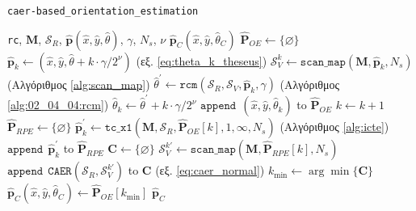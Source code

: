 \begin{algorithm}
  \caption{\texttt{caer-based\_orientation\_estimation}}
  \label{alg:02_04_04:rc}
  \begin{spacing}{1.5}
  \begin{algorithmic}[1]
    \REQUIRE \texttt{rc}, $\bm{M}$, $\mathcal{S}_R$, $\hat{\bm{p}}(\hat{x}, \hat{y}, \hat{\theta})$, $\gamma$, $N_s$, $\nu$
    \ENSURE $\hat{\bm{p}}_C(\hat{x}, \hat{y}, \hat{\theta}_C)$
    \STATE {}$\hat{\bm{P}}_{OE} \leftarrow \{\varnothing\}$
      \STATE $\hat{\bm{p}}_k \leftarrow (\hat{x}, \hat{y}, \hat{\theta} + k \cdot \gamma/2^\nu)$ \hfill (εξ. \ref{eq:theta_k_theseus})
      \STATE $\mathcal{S}_V^k \leftarrow \texttt{scan\_map}(\bm{M}, \hat{\bm{p}}_k, N_s)$ \hfill (Αλγόριθμος \ref{alg:scan_map})
      \STATE $\hat{\theta}^\prime \leftarrow \texttt{rcm}(\mathcal{S}_R, \mathcal{S}_V, \hat{\bm{p}}_k, \gamma)$ \hfill (Αλγόριθμος \ref{alg:02_04_04:rcm})
      \STATE $\hat{\theta}_k \leftarrow \hat{\theta}^\prime + k \cdot \gamma/2^\nu$
      \STATE $\texttt{append} \ \ (\hat{x}, \hat{y}, \hat{\theta}_k)$ to $\hat{\bm{P}}_{OE}$
      \STATE $k \leftarrow k + 1$
    \ENDFOR {}
    \STATE {}$\hat{\bm{P}}_{RPE} \leftarrow \{\varnothing\}$
      \STATE $\hat{\bm{p}}_k^\prime \leftarrow \texttt{tc\_x1}(\bm{M}, \mathcal{S}_R, \hat{\bm{P}}_{OE}[k], 1, \infty, N_s)$ \hfill (Αλγόριθμος \ref{alg:icte})
      \STATE $\texttt{append} \ \ \hat{\bm{p}}_k^\prime$ to $\hat{\bm{P}}_{RPE}$
    \ENDFOR{}
    \STATE {}$\bm{C} \leftarrow \{\varnothing\}$
      \STATE $\mathcal{S}_V^{k \prime} \leftarrow \texttt{scan\_map}(\bm{M}, \hat{\bm{P}}_{RPE}[k], N_s)$
      \STATE $\texttt{append} \ \ \texttt{CAER}(\mathcal{S}_R, \mathcal{S}_V^{k \prime})$ to $\bm{C}$ \hfill (εξ. \ref{eq:caer_normal})
    \ENDFOR{}
    \STATE $k_{\min} \leftarrow \arg\min \{\bm{C}\}$
    \STATE $\hat{\bm{p}}_C(\hat{x}, \hat{y}, \hat{\theta}_C) \leftarrow \hat{\bm{P}}_{OE}[k_{\min}]$
    \RETURN $\hat{\bm{p}}_C$
  \end{algorithmic}
  \end{spacing}
\end{algorithm}


